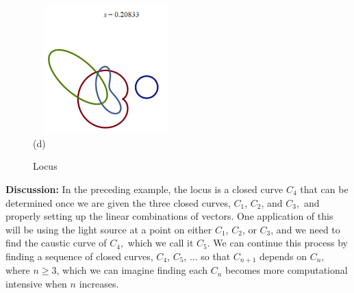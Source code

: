 \documentclass[12pt,a4paper]{article}%
\begin{document}
\begin{figure}
\begin{center}
\qquad
\parbox[b]{2.8in}{\begin{center}
\includegraphics[natheight=2.386000in,natwidth=2.336300in,height=1.9496in,width=2.2405in]{PJH75H1D.pdf}
\\
(d)
\end{center}}
\end{center}
\caption{Locus %
}
\label{fig8}
\end{figure}

\textbf{Discussion: }
In the preceding example, the locus is a closed curve $C_{4}$
that can be determined once we are given the three closed curves,
$C_{1}$, $C_{2}$, and $C_{3},$ and properly setting up the linear combinations of vectors. One
application of this will be using the light source at a point on either
$C_{1}$, $C_{2}$, or $C_{3}$, and we need to find the caustic curve of $C_{4},$
which we call it $C_{5}.$ We can continue this process by finding a sequence of
closed curves, $C_{4}$, $C_{5}$, ... so that $C_{n+1}$ depends on $C_{n}$, where
$n\geq3$, which we can imagine finding each $C_{n}$ becomes more computational
intensive when $n$ increases.
\end{document}
